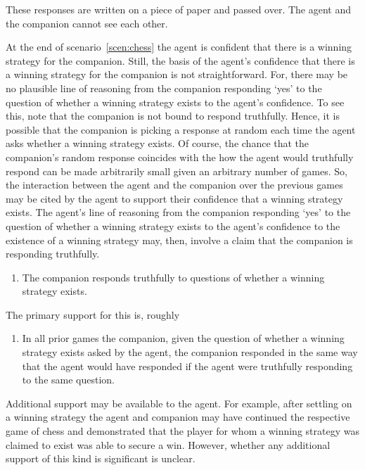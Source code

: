 \documentclass[10pt]{article}
\newcommand{\hozline}[0]{%
  \noindent\hdashrule[0.5ex][c]{\textwidth}{.1pt}{}
}
\begin{document}
\begin{scenario}[Chess]
  \begin{note}
    These responses are written on a piece of paper and passed over.
    The agent and the companion cannot see each other.
  \end{note}
\end{scenario}

At the end of scenario~\ref{scen:chess} the agent is confident that there is a winning strategy for the companion.
Still, the basis of the agent's confidence that there is a winning strategy for the companion is not straightforward.
For, there may be no plausible line of reasoning from the companion responding `yes' to the question of whether a winning strategy exists to the agent's confidence.
To see this, note that the companion is not bound to respond truthfully.
Hence, it is possible that the companion is picking a response at random each time the agent asks whether a winning strategy exists.
Of course, the chance that the companion's random response coincides with the how the agent would truthfully respond can be made arbitrarily small given an arbitrary number of games.
So, the interaction between the agent and the companion over the previous games may be cited by the agent to support their confidence that a winning strategy exists.
The agent's line of reasoning from the companion responding `yes' to the question of whether a winning strategy exists to the agent's confidence to the existence of a winning strategy may, then, involve a claim that the companion is responding truthfully.

\begin{enumerate}[label=(C\arabic*)]
\item The companion responds truthfully to questions of whether a winning strategy exists.
\end{enumerate}

The primary support for this is, roughly

\begin{enumerate}[label=(S\arabic*)]
\item In all prior games the companion, given the question of whether a winning strategy exists asked by the agent, the companion responded in the same way that the agent would have responded if the agent were truthfully responding to the same question.
\end{enumerate}

\hozline

Additional support may be available to the agent.
For example, after settling on a winning strategy the agent and companion may have continued the respective game of chess and demonstrated that the player for whom a winning strategy was claimed to exist was able to secure a win.
However, whether any additional support of this kind is significant is unclear.
\end{document}
